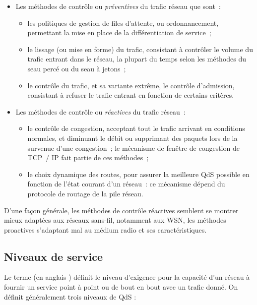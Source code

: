 \begin{itemize}

\item Les méthodes de contrôle  ou \emph{préventives}
du trafic réseau que sont~:
  \begin{itemize}
  \item les politiques de gestion de files d'attente, ou ordonnancement,
        permettant la mise en place de la différentiation de service~;
  \item le lissage (ou mise en forme) du trafic, consistant à contrôler
        le volume du trafic entrant dans le réseau, la plupart du temps
        selon les méthodes du seau percé ou du seau à jetons~;
  \item le contrôle du trafic, et sa variante extrême, le contrôle
        d'admission, consistant à refuser le trafic entrant en
        fonction de certains critères.
  \end{itemize}

\item Les méthodes de contrôle  ou \emph{réactives}
du trafic réseau~:
  \begin{itemize}
  \item le contrôle de congestion, acceptant tout le trafic arrivant
        en conditions normales, et diminuant le débit ou supprimant
        des paquets lors de la survenue d'une congestion~; le mécanisme
        de fenêtre de congestion de TCP~/ IP fait partie de ces méthodes~;
  \item le choix dynamique des routes, pour assurer la meilleure QdS
        possible en fonction de l'état courant d'un réseau~: ce
        mécanisme dépend du protocole de routage de la pile réseau.
  \end{itemize}

\end{itemize}

D'une façon générale, les méthodes de contrôle réactives semblent se
montrer mieux adaptées aux réseaux sans-fil, notamment aux WSN, les
méthodes proactives s'adaptant mal au médium radio et ses caractéristiques.


\subsection{Niveaux de service}
\label{SubsecNivQds}

Le terme  (en anglais ) définit
le niveau d'exigence pour la capacité d'un réseau à fournir un service
point à point ou de bout en bout avec un trafic donné. On définit
généralement trois niveaux de QdS :

